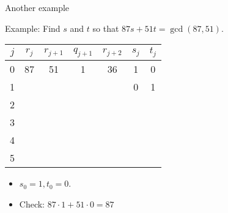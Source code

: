 \documentclass{beamer}
\begin{document}
\begin{frame}{Another example}

Example: Find $s$ and $t$ so that $87s+51t = \gcd(87, 51)$.

\vspace{1em}

\begin{tabular}{|c|c|c|c|c|c|c|}\hline
$j$   &  $r_{j}$    & $r_{j+1}$ & $q_{j+1}$ & $r_{j+2}$ & $s_j$ & $t_j$ \\ \hline\hline
0     &  87         &  51       &    1      &   36      &  1    &   0   \\ \hline
1     &             &           &           &           &  0    &   1   \\ \hline
2     &             &           &           &           &       &       \\ \hline
3     &             &           &           &           &       &       \\ \hline
4     &             &           &           &           &       &       \\ \hline
5     &             &           &           &           &       &       \\ \hline
\end{tabular}

\vspace{1em}

\begin{itemize}
  \item $s_0 = 1, t_0 = 0$.
  \item Check: $87\cdot 1 + 51\cdot 0 = 87$
\end{itemize}

\end{frame}
\end{document}
